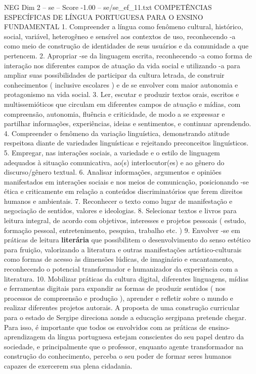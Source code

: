 \begin{textsample}{NEG Dim 2 – se – Score -1.00 – se/se\_ef\_11.txt}  \label{ex:f2_neg_261}
COMPETÊNCIAS ESPECÍFICAS DE LÍNGUA PORTUGUESA PARA O ENSINO FUNDAMENTAL 1.
Compreender a língua como fenômeno cultural, histórico, social, variável, heterogêneo e sensível aos contextos de uso, reconhecendo -a como meio de construção de identidades de seus usuários e da comunidade a que pertencem. 2.
Apropriar -se da linguagem escrita, reconhecendo -a como forma de interação nos diferentes campos de atuação da vida social e utilizando -a para ampliar suas possibilidades de participar da cultura letrada, de construir conhecimentos ( inclusive escolares ) e de se envolver com maior autonomia e protagonismo na vida social. 3.
Ler, escutar e produzir textos orais, escritos e multissemióticos que circulam em diferentes campos de atuação e mídias, com compreensão, autonomia, fluência e criticidade, de modo a se expressar e partilhar informações, experiências, ideias e sentimentos, e continuar aprendendo. 4.
Compreender o fenômeno da variação linguística, demonstrando atitude respeitosa diante de variedades linguísticas e rejeitando preconceitos linguísticos. 5.
Empregar, nas interações sociais, a variedade e o estilo de linguagem adequados à situação comunicativa, ao(s) interlocutor(es) e ao gênero do discurso/gênero textual. 6.
Analisar informações, argumentos e opiniões manifestados em interações sociais e nos meios de comunicação, posicionando -se ética e criticamente em relação a conteúdos discriminatórios que ferem direitos humanos e ambientais. 7.
Reconhecer o texto como lugar de manifestação e negociação de sentidos, valores e ideologias. 8.
Selecionar textos e livros para leitura integral, de acordo com objetivos, interesses e projetos pessoais ( estudo, formação pessoal, entretenimento, pesquisa, trabalho etc. ) 9.
Envolver -se em práticas de leitura \textbf{literária} que possibilitem o desenvolvimento do senso estético para fruição, valorizando a literatura e outras manifestações artístico-culturais como formas de acesso às dimensões lúdicas, de imaginário e encantamento, reconhecendo o potencial transformador e humanizador da experiência com a literatura. 10.
Mobilizar práticas da cultura digital, diferentes linguagens, mídias e ferramentas digitais para expandir as formas de produzir sentidos ( nos processos de compreensão e produção ), aprender e refletir sobre o mundo e realizar diferentes projetos autorais.
A proposta de uma construção curricular para o estado de Sergipe direciona aonde a educação sergipana pretende chegar.
Para isso, é importante que todos os envolvidos com as práticas de ensino-aprendizagem da língua portuguesa estejam conscientes do seu papel dentro da sociedade, e principalmente que o professor, enquanto agente transformador na construção do conhecimento, perceba o seu poder de formar seres humanos capazes de exercerem sua plena cidadania.

\end{textsample}
